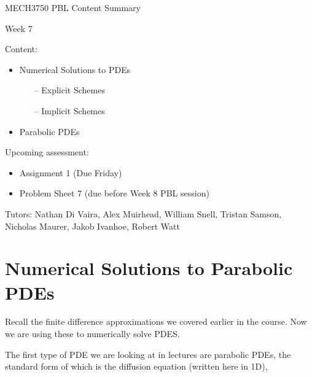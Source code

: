 \documentclass[12pt]{article}
\begin{document}
\begin{center}
{\Huge   MECH3750 PBL Content Summary}

\vspace{6mm}

{\Huge  Week 7}

\end{center}

\vspace{6mm}

{\Large Content:}
{\begin{itemize}
	\item Numerical Solutions to PDEs
	\begin{itemize}
		\item[--] Explicit Schemes
		\item[--] Implicit Schemes
	\end{itemize}
	\item Parabolic PDEs
\end{itemize}}

\vspace{4mm}

{\Large Upcoming assessment:}
{\begin{itemize}
	\item Assignment 1 (Due Friday)
	\item Problem Sheet 7 (due before Week 8 PBL session)
\end{itemize}}

\vspace{4mm}

{Tutors: Nathan Di Vaira, Alex Muirhead, William Snell, Tristan Samson, Nicholas Maurer, Jakob Ivanhoe, Robert Watt}


\pagebreak


\section{Numerical Solutions to Parabolic PDEs}

Recall the finite difference approximations we covered earlier in the course. Now we are using these to numerically solve PDES.

\vspace{4mm}

The first type of PDE we are looking at in lectures are parabolic PDEs, the standard form of which is the diffusion equation (written here in 1D),
\end{document}
